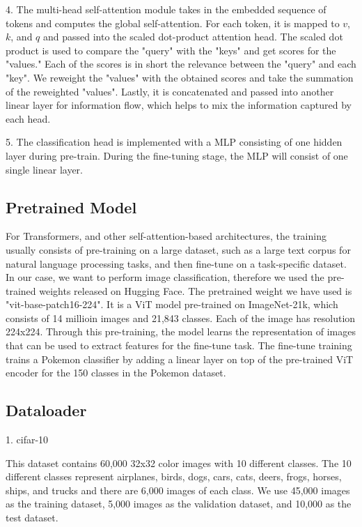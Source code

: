 \documentclass{article} %
\begin{document}
4. The multi-head self-attention module takes in the embedded sequence of tokens and computes the global self-attention.
For each token, it is mapped to $v$, $k$, and $q$ and passed into the scaled dot-product attention head.
The scaled dot product is used to compare the "query" with the "keys" and get scores for the "values."
Each of the scores is in short the relevance between the "query" and each "key".
We reweight the "values" with the obtained scores and take the summation of the reweighted "values".
Lastly, it is concatenated and passed into another linear layer for information flow, which helps to mix the information captured by each head.

5. The classification head is implemented with a MLP consisting of one hidden layer during pre-train.
During the fine-tuning stage, the MLP will consist of one single linear layer.



\subsection{Pretrained Model}
For Transformers, and other self-attention-based architectures, the training usually consists of pre-training on 
a large dataset, such as a large text corpus for natural language processing tasks, and then fine-tune on a 
task-specific dataset. In our case, we want to perform image classification, therefore we used the pre-trained weights
released on Hugging Face. The pretrained weight we have used is "vit-base-patch16-224". It is a ViT model pre-trained
on ImageNet-21k, which consists of 14 millioin images and 21,843 classes. Each of the image has resolution 224x224.
Through this pre-training, the model learns the representation of images that can be used to extract features for the
fine-tune task. The fine-tune training trains a Pokemon classifier by adding a linear layer on top of the pre-trained
ViT encoder for the 150 classes in the Pokemon dataset.

\subsection{Dataloader} %

1. cifar-10

This dataset contains 60,000 32x32 color images with 10 different classes. The 10 different 
classes represent airplanes, birds, dogs, cars, cats, deers, frogs, horses, ships, and trucks 
and there are 6,000 images of each class. We use 45,000 images as the training dataset, 
5,000 images as the validation dataset, and 10,000 as the test dataset.
\end{document}
